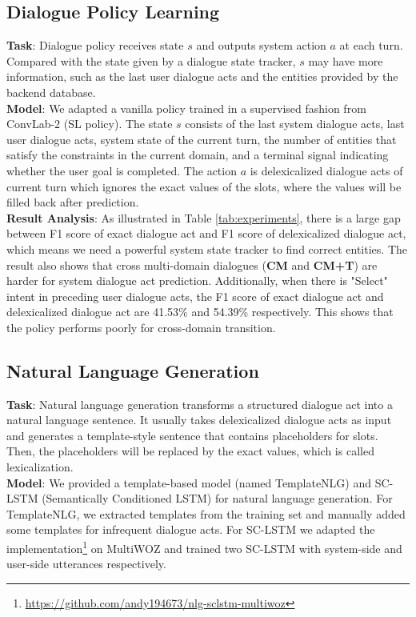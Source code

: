 \subsection{Dialogue Policy Learning}
\textbf{Task}:
Dialogue policy receives state $s$ and outputs system action $a$ at each turn. Compared with the state given by a dialogue state tracker, $s$ may have more information, such as the last user dialogue acts and the entities provided by the backend database.\\

\noindent\textbf{Model}:
We adapted a vanilla policy trained in a supervised fashion from ConvLab-2 (SL policy). 
The state $s$ consists of the last system dialogue acts, last user dialogue acts, system state of the current turn, the number of entities that satisfy the constraints in the current domain, and a terminal signal indicating whether the user goal is completed. The action $a$ is delexicalized dialogue acts of current turn which ignores the exact values of the slots, where the values will be filled back after prediction.\\

\noindent\textbf{Result Analysis}:
As illustrated in Table \ref{tab:experiments}, there is a large gap between F1 score of exact dialogue act and F1 score of delexicalized dialogue act, which means we need a powerful system state tracker to find correct entities.
The result also shows that cross multi-domain dialogues (\textbf{CM} and \textbf{CM+T}) are harder for system dialogue act prediction. 
Additionally, when there is "Select" intent in preceding user dialogue acts, the F1 score of exact dialogue act and delexicalized dialogue act are 41.53\% and 54.39\% respectively. This shows that the policy performs poorly 
for cross-domain transition.

\subsection{Natural Language Generation}
\textbf{Task}:
Natural language generation transforms a structured dialogue act into a natural language sentence. It usually takes delexicalized dialogue acts as input and generates a template-style sentence that contains placeholders for slots. Then, the placeholders will be replaced by the exact values, which is called lexicalization.\\

\noindent\textbf{Model}:
We provided a template-based model (named TemplateNLG) and SC-LSTM (Semantically Conditioned LSTM) \cite{wen2015sclstm}  for natural language generation. For TemplateNLG, we extracted templates from the training set and manually added some templates for infrequent dialogue acts. For SC-LSTM we adapted the implementation\footnote{\url{https://github.com/andy194673/nlg-sclstm-multiwoz}} on MultiWOZ and trained two SC-LSTM with system-side and user-side utterances respectively.\\ 


